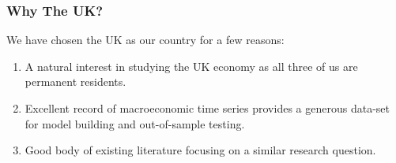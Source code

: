 \begin{frame}
    \frametitle{Why The UK?}
    We have chosen the UK as our country for a few reasons:
    \begin{enumerate}
        \item A natural interest in studying the UK economy as all three of us are permanent residents.
        \item Excellent record of macroeconomic time series provides a generous data-set for model building and out-of-sample testing.
        \item Good body of existing literature focusing on a similar research question.
    \end{enumerate}

\end{frame}